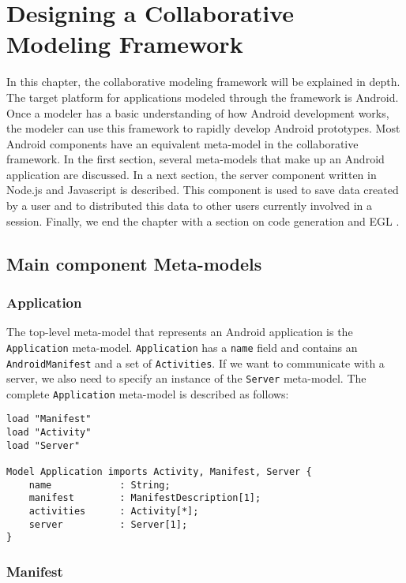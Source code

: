 \chapter{Designing a Collaborative Modeling Framework}

In this chapter, the collaborative modeling framework will be explained in depth. The target platform for applications modeled through the framework is Android. Once a modeler has a basic understanding of how Android development works, the modeler can use this framework to rapidly develop Android prototypes. Most Android components have an equivalent meta-model in the collaborative framework. In the first section, several meta-models that make up an Android application are discussed. In a next section, the server component written in Node.js \cite{NodeJS} and Javascript is described. This component is used to save data created by a user and to distributed this data to other users currently involved in a session. Finally, we end the chapter with a section on code generation and EGL \cite{EGL}.

\section{Main component Meta-models}

\subsection{Application}

The top-level meta-model that represents an Android application is the \texttt{Application} meta-model. \texttt{Application} has a \texttt{name} field and contains an \texttt{AndroidManifest} and a set of \texttt{Activities}. If we want to communicate with a server, we also need to specify an instance of the \texttt{Server} meta-model. The complete \texttt{Application} meta-model is described as follows:

\begin{lstlisting}[label=application-mm,caption=Application meta-model, captionpos=t]
load "Manifest"
load "Activity"
load "Server"

Model Application imports Activity, Manifest, Server {
	name			: String;
	manifest		: ManifestDescription[1];
	activities		: Activity[*];
	server 			: Server[1];
}
\end{lstlisting}

\subsection{Manifest}

